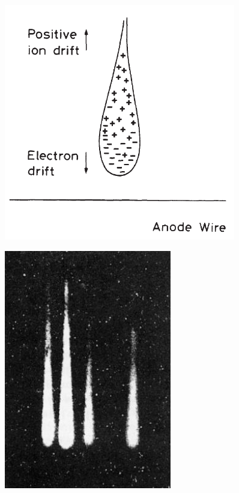 \begin{minipage}{0.5\textwidth}
   \begin{figure}[H]
      \centering
      \includegraphics[width=0.9\textwidth]{immagini/forma_valanga_1.png}
   \end{figure}
\end{minipage}
\begin{minipage}{0.5\textwidth}
   \begin{figure}[H]
      \centering
      \includegraphics[width=0.65\textwidth]{immagini/forma_valanga_2.png}
   \end{figure}
\end{minipage}

